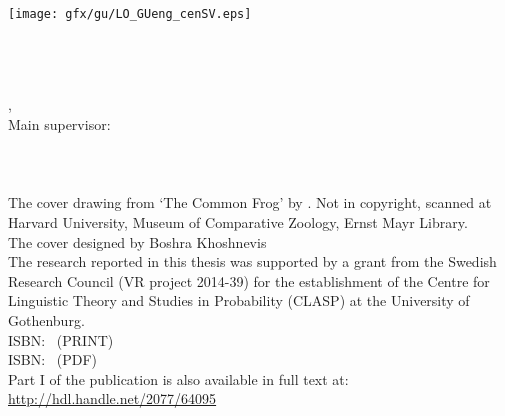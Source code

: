 \ifdefined\isprintversion
\else


\setcounter{page}{1}
\fi

\begin{titlepage}
	\flushright
	\hfill
	\vfill
	{\centering\LARGE\tgherosfont\thesisTitle \par}
	\vfill
	\flushright
\end{titlepage}


\begin{titlepage}
	\tgherosfont
	\centering

	\vfill
	{\large\thesisSubject} \\[5mm]
	{\LARGE\thesisTitle \\[25mm]}
	
	\vfill
	
	{\Large \thesisName} \\[55mm]

	\vfill
	\textsf{\thesisUniversityDepartment} \\
	\textsf{\thesisUniversityGroup} \\ [10mm]
	\vfill

\texttt{[image: gfx/gu/LO\_GUeng\_cenSV.eps]} \\
\thesisDate \\

\end{titlepage}


\hfill
\vfill
{
	\small
	\textbf{\thesisName} \\
	\textit{\thesisTitle} \\
	\thesisSubject, \thesisDate \\
	Main supervisor: \thesisFirstSupervisor \\[1.5em]
	\textbf{\thesisUniversity} \\
	\thesisUniversityDepartment \\
	\thesisUniversityStreetAddress \\[1.5em]
	The cover drawing from `{The Common Frog}' by \cite{thecommonfrog1881}. Not in copyright, scanned at Harvard University, Museum of Comparative Zoology, Ernst Mayr Library. \\
	The cover designed by Boshra Khoshnevis \\[1.5em]
	The research reported in this thesis was supported by a grant from the Swedish Research Council (VR project 2014-39) for the establishment of the Centre for Linguistic Theory and Studies in Probability (CLASP) at the University of Gothenburg.\\[1.5em]
	ISBN: \thesisISBNPrint\ (PRINT) \\
	ISBN: \thesisISBNPDF\ (PDF) \\[1.5em]
	Part I of the publication is also available in full text at: \\
	\url{http://hdl.handle.net/2077/64095}
}
